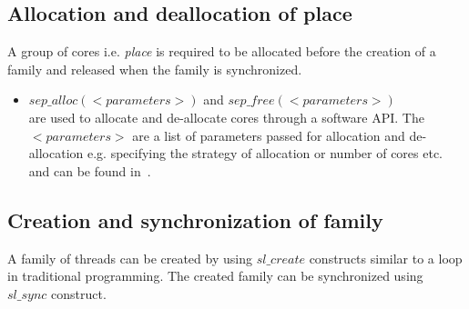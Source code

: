 \documentclass{article}
\begin{document}
\subsection*{Allocation and deallocation of place}

A group of cores i.e. \emph{place} is required to be allocated before the
creation of a family and released when the family is synchronized.

\begin{itemize}

\item $sep\_alloc(<parameters>)$ and $sep\_free(<parameters>)$ \\ are used to
    allocate and de-allocate cores through a software API. The $<parameters>$
    are a list of parameters passed for allocation and de-allocation e.g.
    specifying the strategy of allocation or number of cores etc. and can be
    found in~\cite{SEP}.

\end{itemize}

\subsection*{Creation and synchronization of family}
\label{sn:creation_synchronization}

A family of threads can be created by using $sl\_create$ constructs similar to
a loop in traditional programming. The created family can be synchronized using
$sl\_sync$ construct. 
\end{document}
